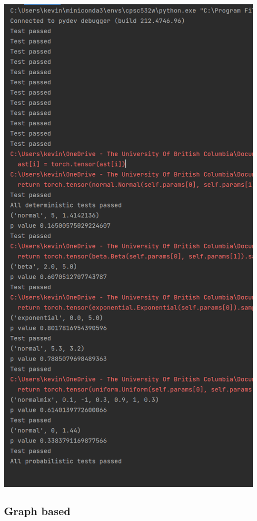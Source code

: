 \documentclass[10pt]{homeworg}
\begin{document}
\begin{center}
\includegraphics[scale=0.5]{figures/evaluation_unit_tests.png}
\end{center}

\subsection{Graph based}
\end{document}
